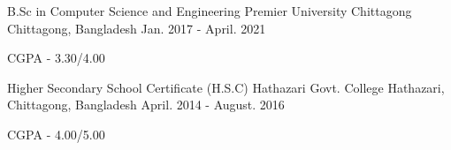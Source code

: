 

\begin{cventries}

  \cventry
    {B.Sc in Computer Science and Engineering} %
    {Premier University Chittagong} %
    {Chittagong, Bangladesh} %
    {Jan. 2017 - April. 2021} %
    {
      \begin{cvitems} %
        \item {CGPA - 3.30/4.00 }
      \end{cvitems}
    }
    
 \cventry
    {Higher Secondary School Certificate (H.S.C)} %
    {Hathazari Govt. College} %
    {Hathazari, Chittagong, Bangladesh} %
    {April. 2014 - August. 2016} %
    {
      \begin{cvitems} %
        \item {CGPA - 4.00/5.00 }
      \end{cvitems}
    }
    

\end{cventries}

